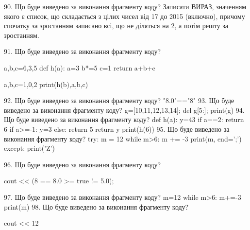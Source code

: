 \documentclass[11pt]{article}
\begin{document}
90. Що буде виведено за виконання фрагменту коду?
Записати ВИРАЗ, значенням якого є список, що складається з цілих чисел від 17 до 2015 (включно), причому спочатку за зростанням записано всі, що не діляться на 2, а потім решту за зростанням.

91. Що буде виведено за виконання фрагменту коду?

a,b,c=6,3,5
def h(a):
    a=3
    b*=5
    c=1
    return a+b+c

a,b,c=1,0,2
print(h(b),a,b,c)

92. Що буде виведено за виконання фрагменту коду?
"8.0"=="8"
93. Що буде виведено за виконання фрагменту коду?
g=[10,11,12,13,14]; del g[5:]; print(g)
94. Що буде виведено за виконання фрагменту коду?
def h(a):
      y=43
      if a==2: return 6
      if a>=-1: y=3
      else: return 5
      return y
   print(h(6))
95. Що буде виведено за виконання фрагменту коду?
try:
    m = 12
    while m>6:
        m += -3
    print(m, end=';')
except:
    print('Z')

96. Що буде виведено за виконання фрагменту коду?

cout << (8 == 8.0 >= true != 5.0);

97. Що буде виведено за виконання фрагменту коду?
m=12
   while m>6: m+=-3
   print(m)
98. Що буде виведено за виконання фрагменту коду?

cout << 12 %
\end{document}
